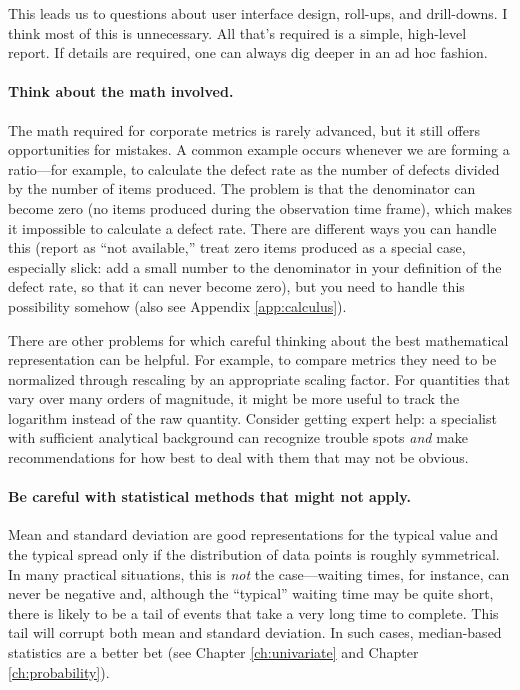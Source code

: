 This leads us to questions about user interface design, roll-ups, and
drill-downs. I think most of this is unnecessary. All that's required
is a simple, high-level report.  If details are required, one can
always dig deeper in an ad hoc fashion.

\paragraph{Think about the math involved.}
The math required for corporate metrics is rarely advanced, but it
still offers opportunities for mistakes. A common example occurs
whenever we are forming a ratio---for example, to calculate the defect
rate as the number of defects divided by the number of items produced.
The problem is that the denominator can become zero (no items produced
during the observation time frame), which makes it impossible to
calculate a defect rate. There are different ways you can handle this
(report as ``not available,'' treat zero items produced as a special
case, especially slick: add a small number to the denominator in your
definition of the defect rate, so that it can never become zero), but
you need to handle this possibility somehow (also see Appendix
\ref{app:calculus}).


There are other problems for which careful thinking about the best
mathematical representation can be helpful.  For example, to compare
metrics they need to be normalized through rescaling by an appropriate
scaling factor. For quantities that vary over many orders of
magnitude, it might be more useful to track the logarithm instead of
the raw quantity. Consider getting expert help: a specialist with
sufficient analytical background can recognize trouble spots
\emph{and} make recommendations for how best to deal with them that
may not be obvious.\vfill\pagebreak

\paragraph{Be careful with statistical methods that might not apply.}
Mean and standard deviation are good representations for the typical
value and the typical spread only if the distribution of data points
is roughly symmetrical. In many practical situations, this is
\emph{not} the case---waiting times, for instance, can never be
negative and, although the ``typical'' waiting time may be quite
short, there is likely to be a tail of events that take a very long
time to complete. This tail will corrupt both mean and standard
deviation. In such cases, median-based statistics are a better bet (see
Chapter \ref{ch:univariate} and Chapter \ref{ch:probability}).

